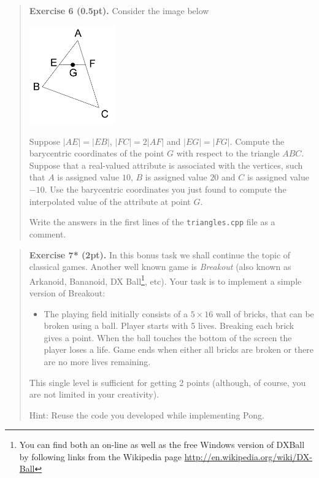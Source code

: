 \documentclass{article}
\newenvironment{exercise}[2]{\begin{verse}\textbf{Exercise #1 (#2pt).} }{
\end{verse}\medskip}
\begin{document}
\begin{exercise}{6}{0.5}
Consider the image below
\begin{center}
\includegraphics[width=0.3\textwidth]{barycentric}
\end{center}
Suppose $|AE| = |EB|$, $|FC| = 2|AF|$ and $|EG| = |FG|$. Compute the barycentric coordinates of the point $G$ with respect to the triangle $ABC$. Suppose that a real-valued attribute is associated with the vertices, such that $A$ is assigned value $10$, $B$ is assigned value $20$ and $C$ is assigned value $-10$. Use the barycentric coordinates you just found to compute the interpolated value of the attribute at point $G$.

Write the answers in the first lines of the \texttt{triangles.cpp} file as a comment.
\end{exercise}

\begin{exercise}{7*}{2}
In this bonus task we shall continue the topic of classical games. Another well known game is \emph{Breakout} (also known as Arkanoid, Bananoid, DX Ball\footnote{You can find both an on-line as well as the free Windows version of DXBall by following links from the Wikipedia page \url{http://en.wikipedia.org/wiki/DX-Ball}}, etc). Your task is to implement a simple version of Breakout:
\begin{itemize}
\item
The playing field initially consists of a $5\times 16$ wall of bricks, that can be broken using a ball. Player starts with 5 lives. Breaking each brick gives a point. When the ball touches the bottom of the screen the player loses a life. Game ends when either all bricks are broken or there are no more lives remaining.
\end{itemize}
This single level is sufficient for getting 2 points (although, of course, you are not limited in your creativity). 

Hint: Reuse the code you developed while implementing Pong.
\end{exercise}
\end{document}
